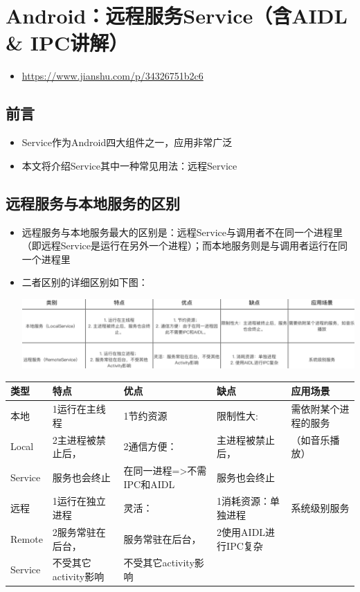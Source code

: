 \documentclass[9pt, b5paper]{article}
\begin{document}
\section{Android：远程服务Service（含AIDL \& IPC讲解）}
\label{sec-5}
\begin{itemize}
\item \url{https://www.jianshu.com/p/34326751b2c6}
\end{itemize}
\subsection{前言}
\label{sec-5-1}
\begin{itemize}
\item Service作为Android四大组件之一，应用非常广泛
\item 本文将介绍Service其中一种常见用法：远程Service
\end{itemize}
\subsection{远程服务与本地服务的区别}
\label{sec-5-2}
\begin{itemize}
\item 远程服务与本地服务最大的区别是：远程Service与调用者不在同一个进程里（即远程Service是运行在另外一个进程）；而本地服务则是与调用者运行在同一个进程里
\item 二者区别的详细区别如下图：

\includegraphics[width=.9\linewidth]{./pic/diff2.png}
\end{itemize}
\begin{center}
\begin{tabular}{lllll}
\hline
类型 & 特点 & 优点 & 缺点 & 应用场景\\
\hline
本地 & 1运行在主线程 & 1节约资源 & 限制性大: & 需依附某个进程的服务\\
Local & 2主进程被禁止后， & 2通信方便： & 主进程被禁止后， & （如音乐播放）\\
Service & 服务也会终止 & 在同一进程=>不需IPC和AIDL & 服务也会终止 & \\
\hline
远程 & 1运行在独立进程 & 灵活： & 1消耗资源：单独进程 & 系统级别服务\\
Remote & 2服务常驻在后台， & 服务常驻在后台， & 2使用AIDL进行IPC复杂 & \\
Service & 不受其它activity影响 & 不受其它activity影响 &  & \\
\hline
\end{tabular}
\end{center}
\end{document}
